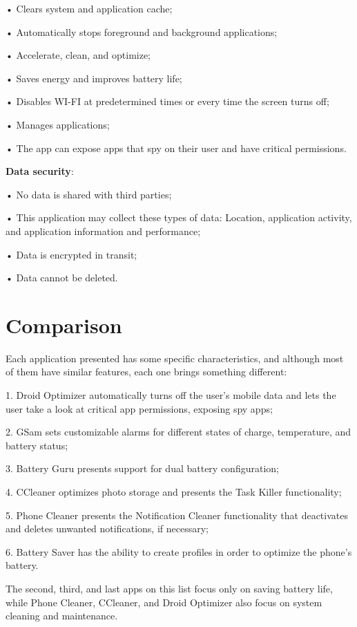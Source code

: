 • Clears system and application cache;

• Automatically stops foreground and background applications;

• Accelerate, clean, and optimize;

• Saves energy and improves battery life;

• Disables WI-FI at predetermined times or every time the screen turns off;

• Manages applications;

• The app can expose apps that spy on their user and have critical permissions.

\textbf{Data security}:

• No data is shared with third parties;

• This application may collect these types of data: Location, application activity, and application information and performance;

• Data is encrypted in transit;

• Data cannot be deleted.


\section{Comparison}\label{sect:comparison}
    Each application presented has some specific characteristics, and although most of them have similar features, each one brings something different:

    1.	Droid Optimizer automatically turns off the user's mobile data and lets the user take a look at critical app permissions, exposing spy apps;
    
    2.	GSam sets customizable alarms for different states of charge, temperature, and battery status;

    3.	Battery Guru presents support for dual battery configuration;

    4.	CCleaner optimizes photo storage and presents the Task Killer functionality;

    5.	Phone Cleaner presents the Notification Cleaner functionality that deactivates and deletes unwanted notifications, if necessary;

    6.	Battery Saver has the ability to create profiles in order to optimize the phone's battery.


    The second, third, and last apps on this list focus only on saving battery life, while Phone Cleaner, CCleaner, and Droid Optimizer also focus on system cleaning and maintenance.
    
